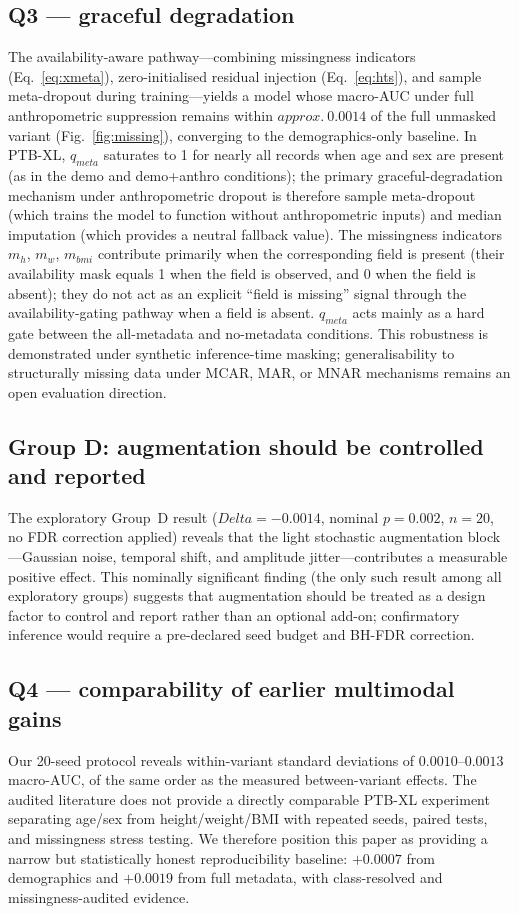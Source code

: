 \documentclass[mathematics,article,submit,pdftex]{Definitions/mdpi}
\def\texttt#1{#1}%
\def\mathrm#1{#1}%
\def\textbf#1{#1}%
\def\Delta{Delta }%
\def\approx{approx.\ }%
\begin{document}
\subsection{Q3 --- graceful degradation}
The availability-aware pathway---combining missingness indicators (Eq.~\eqref{eq:xmeta}), zero-initialised residual injection (Eq.~\eqref{eq:hts}), and sample meta-dropout during training---yields a model whose macro-AUC under full anthropometric suppression remains within $\approx 0.0014$ of the full unmasked variant (Fig.~\ref{fig:missing}), converging to the demographics-only baseline. In PTB-XL, $q_{\mathrm{meta}}$ saturates to 1 for nearly all records when age and sex are present (as in the \texttt{demo} and \texttt{demo+anthro} conditions); the primary graceful-degradation mechanism under anthropometric dropout is therefore \textbf{sample meta-dropout} (which trains the model to function without anthropometric inputs) and \textbf{median imputation} (which provides a neutral fallback value). The missingness indicators $m_h$, $m_w$, $m_{\mathrm{bmi}}$ contribute primarily when the corresponding field is present (their availability mask equals 1 when the field is observed, and 0 when the field is absent); they do not act as an explicit ``field is missing'' signal through the availability-gating pathway when a field is absent. $q_{\mathrm{meta}}$ acts mainly as a hard gate between the all-metadata and no-metadata conditions. This robustness is demonstrated under synthetic inference-time masking; generalisability to structurally missing data under MCAR, MAR, or MNAR mechanisms remains an open evaluation direction.

\subsection{Group D: augmentation should be controlled and reported}
The exploratory Group~D result ($\Delta{=}{-}0.0014$, nominal $p{=}0.002$, $n{=}20$, no FDR correction applied) reveals that the light stochastic augmentation block---Gaussian noise, temporal shift, and amplitude jitter---contributes a measurable positive effect. This nominally significant finding (the only such result among all exploratory groups) suggests that augmentation should be treated as a design factor to control and report rather than an optional add-on; confirmatory inference would require a pre-declared seed budget and BH-FDR correction.

\subsection{Q4 --- comparability of earlier multimodal gains}
Our 20-seed protocol reveals within-variant standard deviations of $0.0010$--$0.0013$ macro-AUC, of the same order as the measured between-variant effects. The audited literature does not provide a directly comparable PTB-XL experiment separating age/sex from height/weight/BMI with repeated seeds, paired tests, and missingness stress testing. We therefore position this paper as providing a narrow but statistically honest reproducibility baseline: $+0.0007$ from demographics and $+0.0019$ from full metadata, with class-resolved and missingness-audited evidence.
\end{document}
